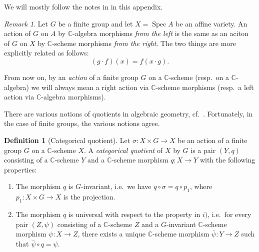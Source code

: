 \documentclass[12pt,a4paper]{amsart}
\theoremstyle{plain}
\theoremstyle{definition}
\newtheorem{defn}[thm]{Definition}
\theoremstyle{remark}
\newtheorem{rem}[thm]{Remark}
\begin{document}
We will mostly follow the notes in \cite[Appendix A]{mus11} in this appendix.

\begin{rem}
  Let $G$ be a finite group and let $X = \operatorname{Spec}{A}$ be an affine variety.
  An action of $G$ on $A$ by $\mathbb{C}$-algebra morphisms \textit{from the left} is the same as an aciton of $G$ on $X$ by $\mathbb{C}$-scheme morphisms \textit{from the right}.
  The two things are more explicitly related as follows:
  \[ (g \cdot f)(x) = f(x \cdot g). \]
\end{rem}

From now on, by an \textit{action} of a finite group $G$ on a $\mathbb{C}$-scheme (resp.~on a $\mathbb{C}$-algebra) we will always mean a right action via $\mathbb{C}$-scheme morphisms (resp.~a left action via $\mathbb{C}$-algebra morphisms).

There are various notions of quotients in algebraic geometry, cf.~\cite[\S 0.1]{mfk94}.
Fortunately, in the case of finite groups, the various notions agree.

\begin{defn}[Categorical quotient]
  Let $\sigma \colon X \times G \to X$ be an action of a finite group $G$ on a $\mathbb{C}$-scheme $X$.
  A \textit{categorical quotient} of $X$ by $G$ is a pair $(Y,q)$ consisting of a $\mathbb{C}$-scheme $Y$ and a $\mathbb{C}$-scheme morphism $q \colon X \to Y$ with the following properties:
  \begin{enumerate}[label=\textit{\roman*)}]
    \item The morphism $q$ is $G$-invariant, i.e.~we have $q \circ \sigma = q \circ p_{1}$, where $p_{1} \colon X \times G \to X$ is the projection.
    \item The morphism $q$ is universal with respect to the property in $i)$, i.e.~for every pair $(Z,\psi)$ consisting of a $\mathbb{C}$-scheme $Z$ and a $G$-invariant $\mathbb{C}$-scheme morphism $\psi \colon X \to Z$, there exists a unique $\mathbb{C}$-scheme morphism $\bar{\psi} \colon Y \to Z$ such that $\bar{\psi} \circ q = \psi$.
  \end{enumerate}
\end{defn}
\end{document}
